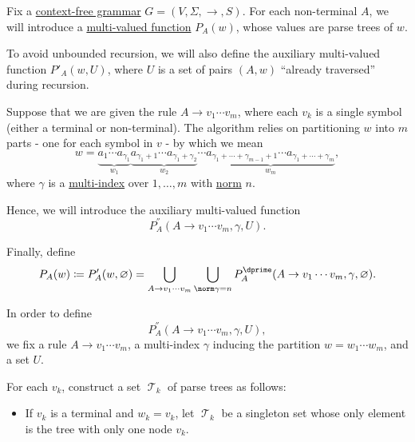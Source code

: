 \begin{algorithm}\label{alg:brute_force_parsing}
  Fix a \hyperref[def:chomsky_hierarchy/context_free]{context-free grammar} \( G = (V, \Sigma, \to, S) \). For each non-terminal \( A \), we will introduce a \hyperref[def:multi_valued_function]{multi-valued function} \( P_A(w) \), whose values are parse trees of \( w \).

  To avoid unbounded recursion, we will also define the auxiliary multi-valued function \( P'_A(w, U) \), where \( U \) is a set of pairs \( (A, w) \) \enquote{already traversed} during recursion.

  Suppose that we are given the rule \( A \to v_1 \cdots v_m \), where each \( v_k \) is a single symbol (either a terminal or non-terminal). The algorithm relies on partitioning \( w \) into \( m \) parts - one for each symbol in \( v \) - by which we mean
  \begin{equation*}
    w = \underbrace{ a_1 \cdots a_{\gamma_1} }_{w_1} \underbrace{ a_{\gamma_1 + 1} \cdots a_{\gamma_1 + \gamma_2} }_{w_2} \cdots \underbrace{ a_{\gamma_1 + \cdots + \gamma_{m-1} + 1} \cdots a_{\gamma_1 + \cdots + \gamma_m} }_{w_m},
  \end{equation*}
  where \( \gamma \) is a \hyperref[def:multi_index]{multi-index} over \( 1, \ldots, m \) with \hyperref[def:multi_index]{norm} \( n \).

  Hence, we will introduce the auxiliary multi-valued function
  \begin{equation*}
    P^\dprime_A(A \to v_1 \cdots v_m, \gamma, U).
  \end{equation*}

  Finally, define
  \begin{equation*}
    P_A(w)
    \coloneqq
    P'_A(w, \varnothing)
    =
    \bigcup_{A \to v_1 \cdots v_m} \bigcup_{\norm \gamma = n} P^\dprime_A(A \to v_1 \cdots v_m, \gamma, \varnothing).
  \end{equation*}

  \begin{thmenum}
     In order to define
    \begin{equation*}
      P^\dprime_A(A \to v_1 \cdots v_m, \gamma, U),
    \end{equation*}
    we fix a rule \( A \to v_1 \cdots v_m \), a multi-index \( \gamma \) inducing the partition \( w = w_1 \cdots w_m \), and a set \( U \).

     For each \( v_k \), construct a set \( \mscrT_k \) of parse trees as follows:
    \begin{itemize}
      \item If \( v_k \) is a terminal and \( w_k = v_k \), let \( \mscrT_k \) be a singleton set whose only element is the tree with only one node \( v_k \).


\end{itemize}
\end{thmenum}
\end{algorithm}
